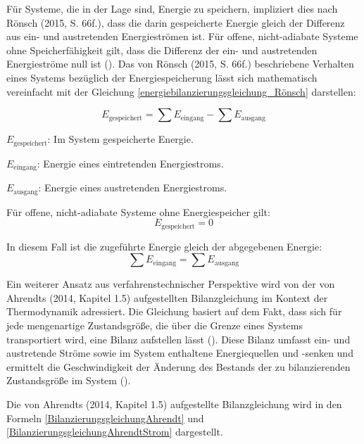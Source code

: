 Für Systeme, die in der Lage sind, Energie zu speichern, impliziert dies nach Rönsch (2015, S. 66f.), dass die darin gespeicherte Energie gleich der 
Differenz aus ein- und austretenden Energieströmen ist.
Für offene, nicht-adiabate Systeme ohne Speicherfähigkeit gilt, dass die Differenz der ein- und austretenden Energieströme null ist (\cite[S. 66f.]{Rönsch.2015}).
Das von Rönsch (2015, S. 66f.) beschriebene Verhalten eines Systems bezüglich der Energiespeicherung lässt sich mathematisch vereinfacht mit der Gleichung 
\eqref{energiebilanzierungsgleichung_Rönsch} darstellen:

\begin{equation}
E_{\text{gespeichert}} = \sum E_{\text{eingang}} - \sum E_{\text{ausgang}}
\label{energiebilanzierungsgleichung_Rönsch}
\end{equation}

\begin{description}
    \item \(E_{\text{gespeichert}}\): Im System gespeicherte Energie.
    \item \(E_{\text{eingang}}\): Energie eines eintretenden Energiestroms.
    \item \(E_{\text{ausgang}}\): Energie eines austretenden Energiestroms.
    \item Für offene, nicht-adiabate Systeme ohne Energiespeicher gilt:
    \[
    E_{\text{gespeichert}} = 0
    \]
    \item In diesem Fall ist die zugeführte Energie gleich der abgegebenen Energie:
    \[
    \sum E_{\text{eingang}} = \sum E_{\text{ausgang}}
    \]
\end{description}

Ein weiterer Ansatz aus verfahrenstechnischer Perspektive wird von der von Ahrendts (2014, Kapitel 1.5) aufgestellten Bilanzgleichung im Kontext der Thermodynamik 
adressiert.
Die Gleichung basiert auf dem Fakt, dass sich für jede mengenartige Zustandsgröße, die über die Grenze eines Systems transportiert wird, eine Bilanz aufstellen lässt 
(\cite[Kapitel 1.5]{Ahrendts.2014}).
Diese Bilanz umfasst ein- und austretende Ströme sowie im System enthaltene Energiequellen und -senken und ermittelt die Geschwindigkeit der Änderung des Bestands der 
zu bilanzierenden Zustandsgröße im System (\cite[Kapitel 1.5]{Ahrendts.2014}).

Die von Ahrendts (2014, Kapitel 1.5) aufgestellte Bilanzgleichung wird in den Formeln \eqref{BilanzierungsgleichungAhrendt} und 
\eqref{BilanzierungsgleichungAhrendtStrom} dargestellt.


